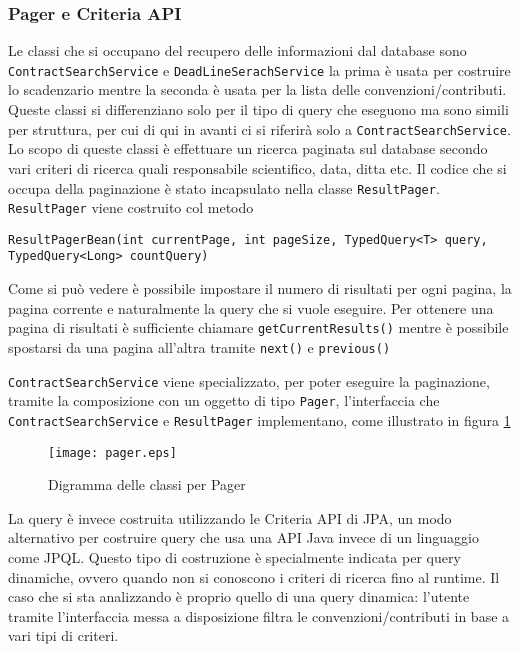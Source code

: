 \subsubsection{Pager e Criteria API}
Le classi che si occupano del recupero delle informazioni dal database sono \texttt{ContractSearchService} e \texttt{DeadLineSerachService} la prima è usata per costruire lo scadenzario mentre la seconda è usata per la lista
delle convenzioni/contributi. Queste classi si differenziano solo per il tipo di query che eseguono ma sono simili per struttura, per cui di qui in avanti ci si riferirà solo a \texttt{ContractSearchService}. 
Lo scopo di queste classi è effettuare un ricerca paginata sul database secondo vari criteri di ricerca quali 
responsabile scientifico, data, ditta etc. Il codice che si occupa della paginazione è stato incapsulato nella classe \texttt{ResultPager}. \texttt{ResultPager} viene costruito
col metodo

\begin{lstlisting}
ResultPagerBean(int currentPage, int pageSize, TypedQuery<T> query, TypedQuery<Long> countQuery)
\end{lstlisting}


Come si può vedere è possibile impostare il numero di risultati per ogni pagina, la pagina corrente e naturalmente la query che si vuole eseguire. Per ottenere una pagina di risultati è sufficiente chiamare \lstinline{getCurrentResults()}
mentre è possibile spostarsi da una pagina all'altra tramite \lstinline{next()} e \lstinline{previous()}

\texttt{ContractSearchService} viene specializzato, per poter eseguire la paginazione, tramite la composizione con un oggetto di tipo \texttt{Pager}, l'interfaccia che \texttt{ContractSearchService} e \texttt{ResultPager} implementano, come
illustrato in figura \ref{pager}


\begin{figure}[h]
  \caption{Digramma delle classi per Pager}
  \label{pager}
  \centering
    \texttt{[image: pager.eps]}
\end{figure}

La query è invece costruita utilizzando le Criteria API di JPA, un modo alternativo per costruire query che usa una API Java invece di un linguaggio
come JPQL. Questo tipo di costruzione è specialmente indicata per query dinamiche, ovvero quando non si conoscono i criteri di ricerca fino al runtime.
Il caso che si sta analizzando è proprio quello di una query dinamica: l'utente tramite l'interfaccia messa a disposizione filtra le convenzioni/contributi
in base a vari tipi di criteri.

